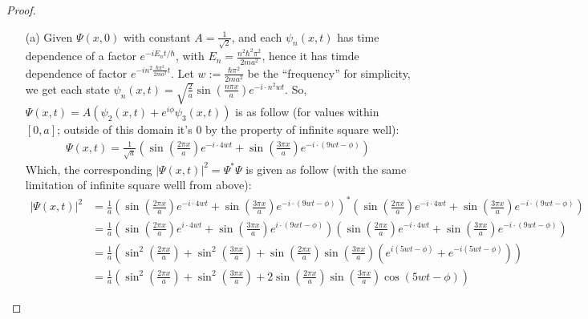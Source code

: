 \documentclass{article}
\begin{document}
\begin{proof}
    \begin{itemize}
        \item[(a)] Given $\Psi(x,0)$ with constant $A=\frac{1}{\sqrt{2}}$, and each $\psi_n(x,t)$ has time dependence of a factor $e^{-iE_nt/\hbar}$, with $E_n = \frac{n^2\hbar^2\pi^2}{2ma^2}$, hence it has timde dependence of factor $e^{-in^2\frac{\hbar\pi^2}{2ma^2}t}$. Let $w:=\frac{\hbar\pi^2}{2ma^2}$ be the ``frequency'' for simplicity, we get each state $\psi_n(x,t)=\sqrt{\frac{2}{a}}\sin(\frac{n\pi x}{a})e^{-i\cdot n^2 wt}$. So, $\Psi(x,t)=A(\psi_2(x,t)+e^{i\phi}\psi_3(x,t))$ is as follow (for values within $[0,a]$; outside of this domain it's $0$ by the property of infinite square well):
        \begin{align}
            \Psi(x,t)=\frac{1}{\sqrt{a}}\left(\sin\left(\frac{2\pi x}{a}\right)e^{-i\cdot 4wt}+\sin\left(\frac{3\pi x}{a}\right)e^{-i\cdot (9wt-\phi)}\right)
        \end{align}
        Which, the corresponding $|\Psi(x,t)|^2=\Psi^*\Psi$ is given as follow (with the same limitation of infinite square welll from above):
        \begin{align}
            |\Psi(x,t)|^2&=\frac{1}{a}\left(\sin\left(\frac{2\pi x}{a}\right)e^{-i\cdot 4wt}+\sin\left(\frac{3\pi x}{a}\right)e^{-i\cdot (9wt-\phi)}\right)^*\left(\sin\left(\frac{2\pi x}{a}\right)e^{-i\cdot 4wt}+\sin\left(\frac{3\pi x}{a}\right)e^{-i\cdot (9wt-\phi)}\right)\\
            &= \frac{1}{a}\left(\sin\left(\frac{2\pi x}{a}\right)e^{i\cdot 4wt}+\sin\left(\frac{3\pi x}{a}\right)e^{i\cdot (9wt-\phi)}\right)\left(\sin\left(\frac{2\pi x}{a}\right)e^{-i\cdot 4wt}+\sin\left(\frac{3\pi x}{a}\right)e^{-i\cdot (9wt-\phi)}\right)\\
            &= \frac{1}{a}\left(\sin^2\left(\frac{2\pi x}{a}\right) + \sin^2\left(\frac{3\pi x}{a}\right) + \sin\left(\frac{2\pi x}{a}\right)\sin\left(\frac{3\pi x}{a}\right)\left(e^{i(5wt-\phi)}+e^{-i(5wt-\phi)}\right)\right)\\
            &= \frac{1}{a}\left(\sin^2\left(\frac{2\pi x}{a}\right) + \sin^2\left(\frac{3\pi x}{a}\right) + 2\sin\left(\frac{2\pi x}{a}\right)\sin\left(\frac{3\pi x}{a}\right)\cos(5wt-\phi)\right)
        \end{align}

        \hfil


\end{itemize}
\end{proof}
\end{document}
